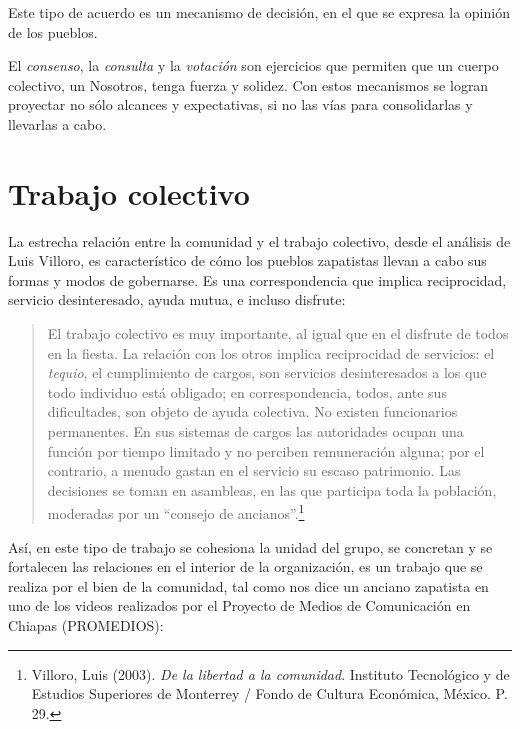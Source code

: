 \documentclass[oneside]{book}
\begin{document}
Este tipo de acuerdo es un mecanismo de decisión, en el que se expresa la opinión de los pueblos.

El \textit{consenso}, la \textit{consulta} y la \textit{votación} son ejercicios que permiten  que un cuerpo colectivo, un Nosotros, tenga fuerza y solidez. Con estos mecanismos se logran proyectar no sólo alcances y expectativas, si no las vías para consolidarlas y llevarlas a cabo.
	
\section{Trabajo colectivo}

La estrecha relación entre la comunidad y el trabajo colectivo, desde el análisis de Luis Villoro, es característico de cómo los pueblos zapatistas llevan a cabo sus formas y modos de gobernarse. Es una correspondencia que implica reciprocidad, servicio desinteresado, ayuda mutua, e incluso disfrute:
\begin{quote}
    El trabajo colectivo es muy importante, al igual que en el disfrute de todos en la fiesta. La relación con los otros implica reciprocidad de servicios: el \textit{tequio}, el cumplimiento de cargos, son servicios desinteresados a los que todo individuo está obligado; en correspondencia, todos, ante sus dificultades, son objeto de ayuda colectiva. No existen funcionarios permanentes. En sus sistemas de cargos las autoridades ocupan una función por tiempo limitado y no perciben remuneración alguna; por el contrario, a menudo gastan en el servicio su escaso patrimonio. Las decisiones se toman en asambleas, en las que participa toda la población, moderadas por un “consejo de ancianos”.\footnote{Villoro, Luis (2003). \textit{De la libertad a la comunidad}. Instituto Tecnológico y de Estudios Superiores de Monterrey / Fondo de Cultura Económica, México. P. 29.}
\end{quote}

Así, en este tipo de trabajo se cohesiona la unidad del grupo, se concretan y se fortalecen las relaciones en el interior de la organización, es un trabajo que se realiza por el bien de la comunidad, tal como nos dice un anciano zapatista en uno de los videos realizados por el Proyecto de Medios de Comunicación en Chiapas (PROMEDIOS): 
\end{document}

